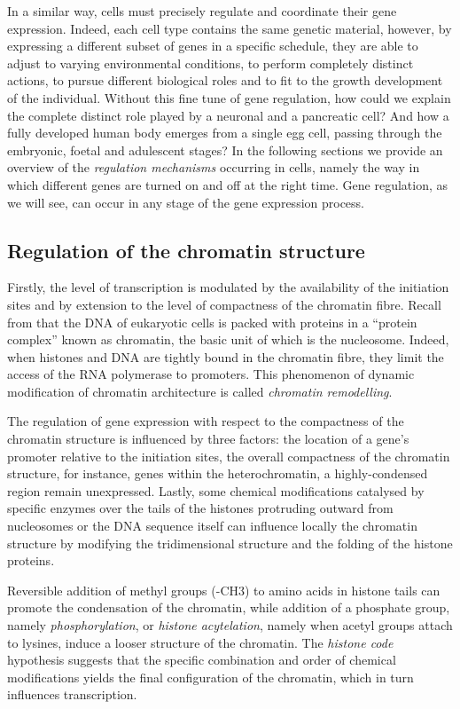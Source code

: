 In a similar way, cells must precisely regulate and coordinate their gene expression. Indeed, each cell type contains the same genetic material, however, by expressing a different subset of genes in a specific schedule, they are able to adjust to varying environmental conditions, to perform completely distinct actions, to pursue different biological roles and to fit to the growth development of the individual. Without this fine tune of gene regulation, how could we explain the complete distinct role played by a neuronal and a pancreatic cell? And how a fully developed human body emerges from a single egg cell, passing through the embryonic, foetal and adulescent stages? In the following sections we provide an overview of the \emph{regulation mechanisms} occurring in cells,  namely the way in which different genes are turned on and off at the right time. Gene regulation, as we will see, can occur in any stage of the gene expression process.

\subsection{Regulation of the chromatin structure}
Firstly, the level of transcription is modulated by the availability of the initiation sites and by extension to the level of compactness of the chromatin fibre.  Recall from   that the DNA of eukaryotic cells is packed with proteins in a \enquote{protein complex} known as chromatin, the basic unit of which is the nucleosome. Indeed, when histones and DNA are tightly bound in the chromatin fibre, they limit the access of the RNA polymerase to promoters. This phenomenon of dynamic modification of chromatin architecture is called \emph{chromatin remodelling}.


The regulation of gene expression with respect to the compactness of the chromatin structure is influenced by three factors: the location of a gene’s promoter relative to the initiation sites, the overall compactness of the chromatin structure, for instance, genes within the heterochromatin, a highly-condensed region remain unexpressed. Lastly, some chemical modifications catalysed by specific enzymes over the tails of the histones protruding outward from nucleosomes or the DNA sequence itself can influence locally the chromatin structure by modifying the tridimensional structure and the folding of the histone proteins. 

Reversible addition of methyl groups (-CH3) to amino acids in histone tails can promote the condensation of the chromatin, while addition of a phosphate group, namely \emph{phosphorylation},  or \emph{histone acytelation}, namely when acetyl groups attach to lysines, induce a looser structure of the chromatin. The \emph{histone code} hypothesis suggests that the specific combination and order of chemical modifications yields the final configuration of the chromatin, which in turn influences transcription.


